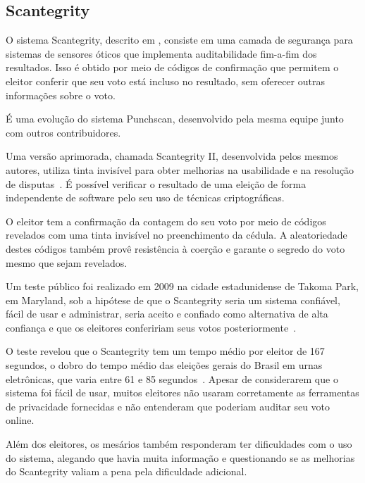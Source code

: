 \subsection{Scantegrity}

O sistema Scantegrity, descrito em \textcite{chaum2008scantegrity}, consiste em
uma camada de segurança para sistemas de sensores óticos que implementa
auditabilidade fim-a-fim dos resultados. Isso é obtido por meio de códigos de
confirmação que permitem o eleitor conferir que seu voto está incluso no
resultado, sem oferecer outras informações sobre o voto.

É uma evolução do sistema Punchscan, desenvolvido pela mesma equipe junto com
outros contribuidores.

Uma versão aprimorada, chamada Scantegrity II, desenvolvida pelos mesmos
autores, utiliza tinta invisível para obter melhorias na usabilidade e na
resolução de disputas~\cite{chaum2008scantegrityII}. É possível verificar o
resultado de uma eleição de forma independente de software pelo seu uso de
técnicas criptográficas.

O eleitor tem a confirmação da contagem do seu voto por meio de códigos
revelados com uma tinta invisível no preenchimento da cédula. A aleatoriedade
destes códigos também provê resistência à coerção e garante o segredo do voto
mesmo que sejam revelados.

Um teste público foi realizado em 2009 na cidade estadunidense de Takoma Park,
em Maryland, sob a hipótese de que o Scantegrity seria um sistema confiável,
fácil de usar e administrar, seria aceito e confiado como alternativa de alta
confiança e que os eleitores confeririam seus votos
posteriormente~\cite{sherman2010scantegrity}.

O teste revelou que o Scantegrity tem um tempo médio por eleitor de 167
segundos, o dobro do tempo médio das eleições gerais do Brasil em urnas
eletrônicas, que varia entre 61 e 85 segundos~\cite{tse2014tempomedio}. Apesar
de considerarem que o sistema foi fácil de usar, muitos eleitores não usaram
corretamente as ferramentas de privacidade fornecidas e não entenderam que
poderiam auditar seu voto online.

Além dos eleitores, os mesários também responderam ter dificuldades com o uso
do sistema, alegando que havia muita informação e questionando se as melhorias
do Scantegrity valiam a pena pela dificuldade adicional.
